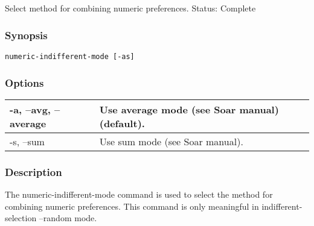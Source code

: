 \subsection{}
\label{numeric-indifferent-mode}
Select method for combining numeric preferences. 
 Status: Complete
\subsubsection*{Synopsis}
\begin{verbatim}
numeric-indifferent-mode [-as]
\end{verbatim}
\subsubsection*{Options}
\begin{tabular}{|l|l|}
\hline 
 -a, --avg, --average  & Use average mode (see Soar manual) (default).  \\
 \hline 
 -s, --sum  & Use sum mode (see Soar manual).  \\
 \hline 
\end{tabular}
\subsubsection*{Description}
 The numeric-indifferent-mode command is used to select the method for combining numeric preferences. This command is only meaningful in indifferent-selection --random  mode. 
